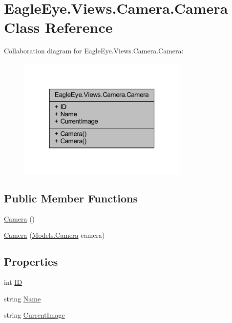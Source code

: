 \hypertarget{class_eagle_eye_1_1_views_1_1_camera_1_1_camera}{}\section{Eagle\+Eye.\+Views.\+Camera.\+Camera Class Reference}
\label{class_eagle_eye_1_1_views_1_1_camera_1_1_camera}


Collaboration diagram for Eagle\+Eye.\+Views.\+Camera.\+Camera\+:\nopagebreak
\begin{figure}[H]
\begin{center}
\leavevmode
\includegraphics[width=241pt]{class_eagle_eye_1_1_views_1_1_camera_1_1_camera__coll__graph}
\end{center}
\end{figure}
\subsection*{Public Member Functions}
\begin{DoxyCompactItemize}
\item 
\mbox{\hyperlink{class_eagle_eye_1_1_views_1_1_camera_1_1_camera_ab3ccc315a6ac49b823bcb2985f20ec0b}{Camera}} ()
\item 
\mbox{\hyperlink{class_eagle_eye_1_1_views_1_1_camera_1_1_camera_a346c5d9185abc85856b4fba46edaf101}{Camera}} (\mbox{\hyperlink{class_eagle_eye_1_1_models_1_1_camera}{Models.\+Camera}} camera)
\end{DoxyCompactItemize}
\subsection*{Properties}
\begin{DoxyCompactItemize}
\item 
int \mbox{\hyperlink{class_eagle_eye_1_1_views_1_1_camera_1_1_camera_adde1c217f5dec95f622165afd7f1af16}{ID}}
\item 
string \mbox{\hyperlink{class_eagle_eye_1_1_views_1_1_camera_1_1_camera_aac0993dea066c34a044f51f23194551c}{Name}}
\item 
string \mbox{\hyperlink{class_eagle_eye_1_1_views_1_1_camera_1_1_camera_aae407995d15f660d45e7ed301146e698}{Current\+Image}}
\end{DoxyCompactItemize}


